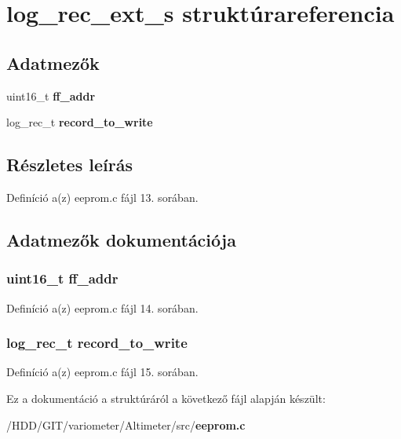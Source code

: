 \section{log\-\_\-rec\-\_\-ext\-\_\-s struktúrareferencia}
\label{structlog__rec__ext__s}
\subsection*{Adatmezők}
\begin{DoxyCompactItemize}
\item 
uint16\-\_\-t {\bf ff\-\_\-addr}
\item 
log\-\_\-rec\-\_\-t {\bf record\-\_\-to\-\_\-write}
\end{DoxyCompactItemize}


\subsection{Részletes leírás}


Definíció a(z) eeprom.\-c fájl 13. sorában.



\subsection{Adatmezők dokumentációja}
\subsubsection[{ff\-\_\-addr}]{\setlength{\rightskip}{0pt plus 5cm}uint16\-\_\-t ff\-\_\-addr}\label{structlog__rec__ext__s_a18264237eda76d12ba51a07955e06844}


Definíció a(z) eeprom.\-c fájl 14. sorában.

\subsubsection[{record\-\_\-to\-\_\-write}]{\setlength{\rightskip}{0pt plus 5cm}log\-\_\-rec\-\_\-t record\-\_\-to\-\_\-write}\label{structlog__rec__ext__s_a3c90f7ced121dbf41d1654e740a4939d}


Definíció a(z) eeprom.\-c fájl 15. sorában.



Ez a dokumentáció a struktúráról a következő fájl alapján készült\-:\begin{DoxyCompactItemize}
\item 
/\-H\-D\-D/\-G\-I\-T/variometer/\-Altimeter/src/{\bf eeprom.\-c}\end{DoxyCompactItemize}
